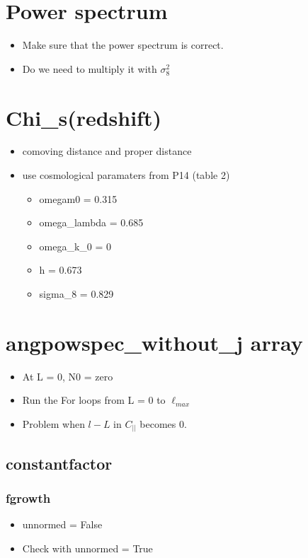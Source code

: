 \documentclass[12pt]{article}
\numberwithin{equation}{section}
\begin{document}
\section{Power spectrum}
	\begin{itemize}
		\item Make sure that the power spectrum is correct.
		\item Do we need to multiply it with $ \sigma_8^2 $
	\end{itemize}
\section{Chi\_s(redshift)}
	\begin{itemize}
		\item comoving distance and proper distance
		\item use cosmological paramaters from P14 (table 2)
			\begin{itemize}
				\item omegam0 = 0.315
				\item omega\_lambda = 0.685
				\item omega\_k\_0 = 0
				\item h = 0.673
				\item sigma\_8 = 0.829
			\end{itemize}
	\end{itemize}
\section{angpowspec\_without\_j array}
	\begin{itemize}
		\item At L = 0, N0  = zero
		\item Run the For loops from L = 0 to $\ell_{max}$
		\item Problem when $ l - L $ in $ C_{||} $ becomes 0.
	\end{itemize}
	\subsection{constantfactor}
		\subsubsection{fgrowth}
			\begin{itemize}
				\item unnormed = False
				\item Check with unnormed = True
			\end{itemize}
\end{document}
